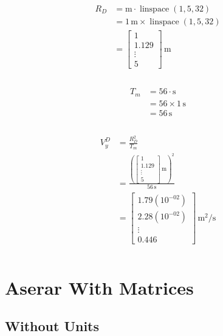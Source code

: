 \documentclass{report}
\begin{document}
\begin{align}
\begin{split}
R_{D}	&= \mathrm{m} \cdot \operatorname{linspace}{\left (1,5,32 \right )}\\
		&= 1\,\mathrm{m} \times \operatorname{linspace}{\left (1,5,32 \right )}\\
		&= \left[\begin{matrix}1\\1.129\\\vdots\\5\end{matrix}\right]\,\mathrm{m}\\
\end{split}
\end{align}

\begin{align}
\begin{split}
T_{m}	&= 56 \cdot \mathrm{s}\\
		&= 56 \times 1\,\mathrm{s}\\
		&= 56\,\mathrm{s}\\
\end{split}
\end{align}

\begin{align}
\begin{split}
V^{D}_{y}	&= \frac{R_{D}^{2}}{T_{m}}\\
			&= \frac{\left(\left[\begin{matrix}1\\1.129\\\vdots\\5\end{matrix}\right]\,\mathrm{m}\right)^{2}}{56\,\mathrm{s}}\\
			&= \left[\begin{matrix}1.79(10^{-02})\\2.28(10^{-02})\\\vdots\\0.446\end{matrix}\right]\,\mathrm{{m^{2}}\slash{s}}\\
\end{split}
\end{align}

\chapter{Aserar With Matrices}
\section{Without Units}
\end{document}
